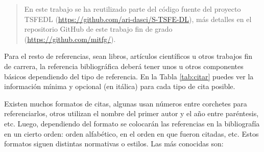 \begin{quote}
\begin{it}
    En este trabajo se ha reutilizado parte del código fuente del proyecto TSFEDL (\url{https://github.com/ari-dasci/S-TSFE-DL}), más detalles en el repositorio GitHub de este trabajo fin de grado (\url{https://github.com/mitfg/}).
\end{it}
\end{quote}

Para el resto de referencias, sean libros, artículos científicos u otros trabajos fin de carrera, la referencia bibliográfica deberá tener unos u otros componentes básicos dependiendo del tipo de referencia. En la Tabla \ref{tab:citar} puedes ver la información mínima y opcional (en itálica) para cada tipo de cita posible.
    
Existen muchos formatos de citas, algunas usan números entre corchetes para referenciarlos, otros utilizan el nombre del primer autor y el año entre paréntesis, etc. Luego, dependiendo del formato se colocarán las referencias en la bibliografía en un cierto orden: orden alfabético, en el orden en que fueron citadas, etc. Estos formatos siguen distintas normativas o estilos. Las más conocidas son:

